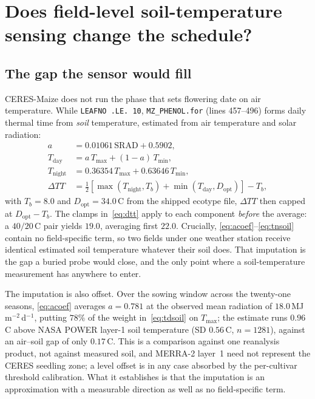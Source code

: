 \section{Does field-level soil-temperature sensing change the schedule?}
\label{sec:iot}

\subsection{The gap the sensor would fill}

CERES-Maize does not run the phase that sets flowering date on air
temperature. While \texttt{LEAFNO .LE. 10}, \texttt{MZ\_PHENOL.for} (lines
457--496) forms daily thermal time from \emph{soil} temperature, estimated
from air temperature and solar radiation:
\begin{align}
a &= 0.01061\,\mathrm{SRAD} + 0.5902, \label{eq:acoef}\\
T_{\mathrm{day}} &= a\,T_{\max} + (1-a)\,T_{\min}, \label{eq:tdsoil}\\
T_{\mathrm{night}} &= 0.36354\,T_{\max} + 0.63646\,T_{\min}, \label{eq:tnsoil}\\
\Delta T\!T &= \tfrac{1}{2}\!\left[\max(T_{\mathrm{night}},T_b)
  + \min(T_{\mathrm{day}},D_{\mathrm{opt}})\right] - T_b, \label{eq:dtt}
\end{align}
with $T_b=8.0$ and $D_{\mathrm{opt}}=34.0$\,\textdegree C from the shipped
ecotype file, $\Delta TT$ then capped at $D_{\mathrm{opt}}-T_b$. The clamps
in~\eqref{eq:dtt} apply to each component \emph{before} the average: a
$40/20$\,\textdegree C pair yields $19.0$, averaging first $22.0$.
Crucially, \eqref{eq:acoef}--\eqref{eq:tnsoil} contain no field-specific
term, so two fields under one weather station receive identical estimated
soil temperature whatever their soil does. That imputation is the gap a
buried probe would close, and the only point where a soil-temperature
measurement has anywhere to enter.

The imputation is also offset. Over the sowing window across the twenty-one
seasons, \eqref{eq:acoef} averages $a = 0.781$ at the observed mean
radiation of $18.0$\,MJ\,m$^{-2}$\,d$^{-1}$, putting $78\%$ of the weight
in~\eqref{eq:tdsoil} on $T_{\max}$; the estimate runs $0.96$\,\textdegree C
above NASA POWER layer-1 soil temperature (SD $0.56$\,\textdegree C,
$n = 1281$), against an air--soil gap of only $0.17$\,\textdegree C. This is
a comparison against one reanalysis product, not against measured soil, and
MERRA-2 layer~1 need not represent the CERES seedling zone; a level offset
is in any case absorbed by the per-cultivar threshold calibration. What it
establishes is that the imputation is an approximation with a measurable
direction as well as no field-specific term.

